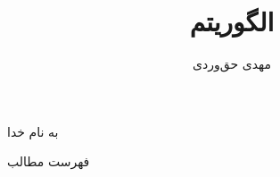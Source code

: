 \documentclass[aspectratio=169, dvipsnames, svgnames, x11names]{beamer}
\title{الگوریتم \lr{Timsort}}
\author{
مهدی حق‌وردی
}
\institute{
\\
\texttt{[image: logos/ui.png]}}
\date{}
\begin{document}
\begin{frame}[plain]
\begin{center}
به نام خدا
\end{center}

\maketitle

\end{frame}

\setcounter{framenumber}{0}
\raggedleft

\begin{frame}{فهرست مطالب}
\begin{flushright}
\tableofcontents
\end{flushright}
\end{frame}







% 
% 
\end{document}
